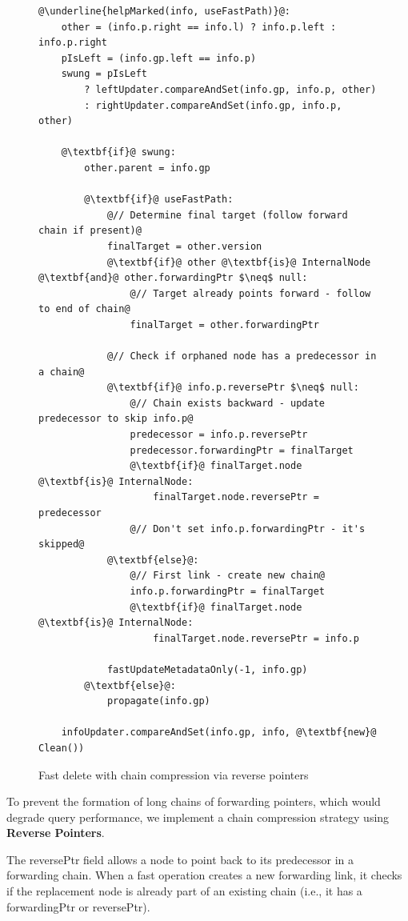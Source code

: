 \documentclass[acmsmall,screen,nonacm]{acmart}
\newcommand{\codestyle}[1]{{{\fontsize{9}{10}\ttfamily #1}}}
\begin{document}
\begin{figure}[H]
\begin{lstlisting}
@\underline{helpMarked(info, useFastPath)}@:
    other = (info.p.right == info.l) ? info.p.left : info.p.right
    pIsLeft = (info.gp.left == info.p)
    swung = pIsLeft
        ? leftUpdater.compareAndSet(info.gp, info.p, other)
        : rightUpdater.compareAndSet(info.gp, info.p, other)
    
    @\textbf{if}@ swung:
        other.parent = info.gp
        
        @\textbf{if}@ useFastPath:
            @// Determine final target (follow forward chain if present)@
            finalTarget = other.version
            @\textbf{if}@ other @\textbf{is}@ InternalNode @\textbf{and}@ other.forwardingPtr $\neq$ null:
                @// Target already points forward - follow to end of chain@
                finalTarget = other.forwardingPtr
            
            @// Check if orphaned node has a predecessor in a chain@
            @\textbf{if}@ info.p.reversePtr $\neq$ null:
                @// Chain exists backward - update predecessor to skip info.p@
                predecessor = info.p.reversePtr
                predecessor.forwardingPtr = finalTarget
                @\textbf{if}@ finalTarget.node @\textbf{is}@ InternalNode:
                    finalTarget.node.reversePtr = predecessor
                @// Don't set info.p.forwardingPtr - it's skipped@
            @\textbf{else}@:
                @// First link - create new chain@
                info.p.forwardingPtr = finalTarget
                @\textbf{if}@ finalTarget.node @\textbf{is}@ InternalNode:
                    finalTarget.node.reversePtr = info.p
            
            fastUpdateMetadataOnly(-1, info.gp)
        @\textbf{else}@:
            propagate(info.gp)
    
    infoUpdater.compareAndSet(info.gp, info, @\textbf{new}@ Clean())
\end{lstlisting}
\caption{Fast delete with chain compression via reverse pointers}
\label{fig:fast-delete-final}
\end{figure}

To prevent the formation of long chains of forwarding pointers, which would degrade query performance, we implement a chain compression strategy using \textbf{Reverse Pointers}.

The \codestyle{reversePtr} field allows a node to point back to its predecessor in a forwarding chain. When a fast operation creates a new forwarding link, it checks if the replacement node is already part of an existing chain (i.e., it has a \codestyle{forwardingPtr} or \codestyle{reversePtr}).
\end{document}
